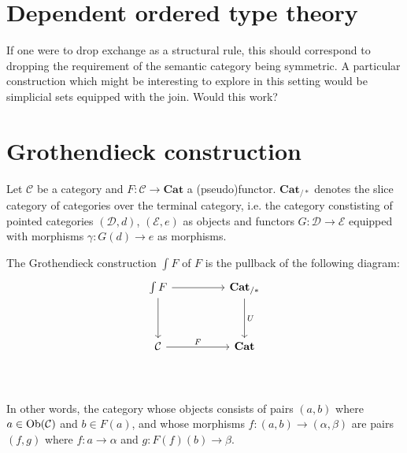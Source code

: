 \section{Dependent ordered type theory}
If one were to drop exchange as a structural rule, this should correspond to dropping the requirement of the semantic category being symmetric. A particular construction which might be interesting to explore in this setting would be simplicial sets equipped with the join. Would this work?



\newpage


\section{Grothendieck construction}
Let $\mathcal{C}$ be a category and $F : \mathcal{C} \to \mathbf{Cat}$ a (pseudo)functor. $\textbf{Cat}_{/*}$ denotes the slice category of categories over the terminal category, i.e. the category constisting of pointed categories $(\mathcal{D}, d)$, $(\mathcal{E}, e)$ as objects and functors $G : \mathcal{D} \to \mathcal{E}$ equipped with morphisms $\gamma : G(d) \to e$ as morphisms.

The Grothendieck construction $\int F$ of $F$ is the pullback of the following diagram:
\[
\ti
\int F \ar[r] \ar[d] & \textbf{Cat}_{/*} \ar[d, "U"] \\
\mathcal{C} \ar[r, "F"] & \textbf{Cat} \\
\kz
\]
In other words, the category whose objects consists of pairs $(a, b)$ where $a \in \operatorname{\text{Ob}}(\mathcal{C})$ and $b \in F(a)$, and whose morphisms $f : (a, b) \to (\alpha, \beta)$ are pairs $(f, g)$ where $f: a \to \alpha$ and $g : F(f)(b) \to \beta$.
